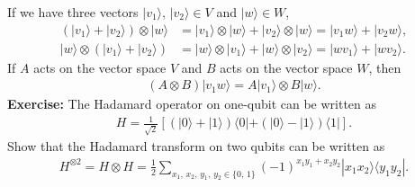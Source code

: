 \documentclass{beamer}
\begin{document}
\begin{frame}
\justify
If we have three vectors $|v_1\rangle,\, |v_2\rangle \in V$ and $|w\rangle \in W$,
\begin{align}
(|v_1\rangle + |v_2\rangle) \otimes |w\rangle & = |v_1\rangle \otimes |w\rangle + |v_2\rangle \otimes |w\rangle = |v_1w\rangle + |v_2w\rangle, \\
|w\rangle \otimes (|v_1\rangle + |v_2\rangle) & = |w\rangle \otimes |v_1\rangle + |w\rangle \otimes |v_2\rangle = |wv_1\rangle + |wv_2\rangle.
\end{align}
\vfill
If $A$ acts on the vector space $V$ and $B$ acts on the vector space $W$, then
\begin{align}
(A \otimes B) |v_1w\rangle = A|v_1\rangle \otimes B|w\rangle.
\end{align}
\vfill
\textbf{Exercise:} The Hadamard operator on one-qubit can be written as
\begin{align}
H = \frac{1}{\sqrt{2}} \left[ (|0\rangle + |1\rangle)\langle0| + (|0\rangle - |1\rangle)\langle1| \right].
\end{align}
Show that the Hadamard transform on two qubits can be written as
\begin{align}
H^{\otimes 2} = H \otimes H = \frac{1}{2} \sum_{x_1,\,x_2,\,y_1,\,y_2 \in \{0,\,1\}} (-1)^{x_1 y_1 + x_2 y_2} |x_1x_2\rangle \langle y_1y_2|.
\end{align}
\end{frame}

\end{document}
